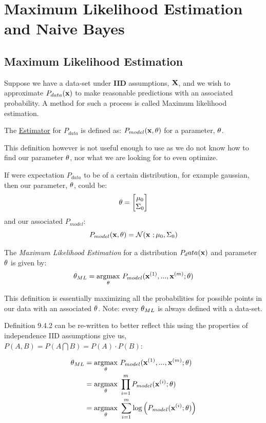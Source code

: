 \chapter{Maximum Likelihood Estimation and Naive Bayes}
\label{Maximum Likelihood estimation}

\section{Maximum Likelihood Estimation}

Suppose we have a data-set under \textbf{IID} assumptions, $\MX$, and we wish to approximate $P_{data}(\vx)$ to make reasonable predictions with an associated probability. A method for such a process is called Maximum likelihood estimation. \\

\begin{definition}
    The \underline{Estimator} for $P_{data}$ is defined as: $P_{model}(\vx,\vtheta)$ for a parameter, $\vtheta$. 
\end{definition}

This definition however is not useful enough to use as we do not know how to find our parameter $\vtheta$, nor what we are looking for to even optimize. \\

\begin{example}
    If were expectation $P_{data}$ to be of a certain distribution, for example gaussian, then our parameter, $\vtheta$, could be: 
    $$\vtheta = \begin{bmatrix} \mu_0 \\ \Sigma_0 \end{bmatrix}$$
    and our associated $P_{model}$:
    $$P_{model}(\vx,\vtheta) = \Normal(\vx\ ;\mu_0, \Sigma_0)$$
\end{example}

\begin{definition}
    The \textit{Maximum Likelihood Estimation} for a distribution $P_data(\vx)$ and parameter $\vtheta$ is given by:
    $$\vtheta_{ML} = \underset{\vtheta}{\argmax}\ P_{model}(\vx^{(1)},...,\vx^{(m)};\vtheta)$$
\end{definition}
\newpage
This definition is essentially maximizing all the probabilities for possible points in our data with an associated $\vtheta$. Note: every $\vtheta_{ML}$ is always defined with a data-set. 
\begin{example}
    
    Definition 9.4.2 can be re-written to better reflect this using the properties of independence IID assumptions give us, $P(A,B) = P(A\bigcap B) = P(A)\cdot P(B)$: 

    \begin{align*}
       \vtheta_{ML} &= \underset{\vtheta}{\argmax}\ P_{model}(\vx^{(1)},...,\vx^{(m)};\vtheta) \\
      & = \underset{\vtheta}{\argmax}\ \prod_{i=1}^m P_{model}(\vx^{(i)};\vtheta) \\
      & = \underset{\vtheta}{\argmax}\ \sum_{i=1}^m \log\left(P_{model}(\vx^{(i)};\vtheta)\right)
    \end{align*}
\end{example}

